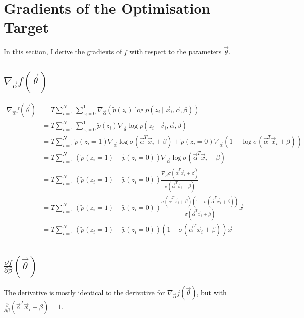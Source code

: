 \documentclass[a4paper]{article}
\begin{document}
    \section{Gradients of the Optimisation Target}

        In this section, I derive the gradients of $f$ with respect to the parameters $\vec \theta$.

        \subsection{$\nabla_{\vec \alpha} f(\vec \theta)$}

            \begin{align*}
                \nabla_{\vec \alpha} f(\vec \theta) &= T \sum_{i = 1}^N \sum_{z_i = 0}^1 \nabla_{\vec \alpha} (\tilde p(z_i) \log p(z_i \mid \vec x_i, \vec \alpha, \beta))\\
                    &= T \sum_{i = 1}^N \sum_{z_i = 0}^1 \tilde p(z_i) \nabla_{\vec \alpha} \log p(z_i \mid \vec x_i, \vec \alpha, \beta)\\
                    &= T \sum_{i = 1}^N \tilde p(z_i = 1) \nabla_{\vec \alpha} \log \sigma(\vec \alpha^T \vec x_i + \beta) + \tilde p(z_i = 0) \nabla_{\vec \alpha} (1 - \log \sigma(\vec \alpha^T \vec x_i + \beta))\\
                    &= T \sum_{i = 1}^N (\tilde p(z_i = 1) - \tilde p(z_i = 0)) \nabla_{\vec \alpha} \log \sigma(\vec \alpha^T \vec x_i + \beta)\\
                    &= T \sum_{i = 1}^N (\tilde p(z_i = 1) - \tilde p(z_i = 0)) \frac{\nabla_{\vec \alpha} \sigma(\vec \alpha^T \vec x_i + \beta)}{\sigma(\vec \alpha^T \vec x_i + \beta)}\\
                    &= T \sum_{i = 1}^N (\tilde p(z_i = 1) - \tilde p(z_i = 0)) \frac{\sigma(\vec \alpha^T \vec x_i + \beta)(1 - \sigma(\vec \alpha^T \vec x_i + \beta))}{\sigma(\vec \alpha^T \vec x_i + \beta)} \vec x\\
                    &= T \sum_{i = 1}^N (\tilde p(z_i = 1) - \tilde p(z_i = 0)) (1 - \sigma(\vec \alpha^T \vec x_i + \beta)) \vec x\\
            \end{align*}

        \subsection{$\frac{\partial f}{\partial \beta}(\vec \theta)$}

            The derivative is mostly identical to the derivative for $\nabla_{\vec \alpha} f(\vec \theta)$, but with $\frac{\partial}{\partial \beta} (\vec \alpha^T \vec x_i + \beta) = 1$.
\end{document}
